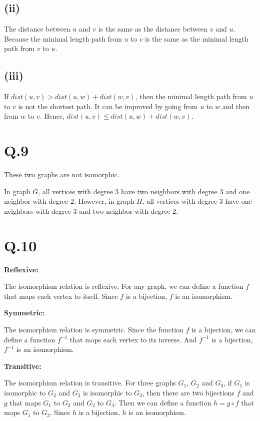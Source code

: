 \documentclass[a4paper,12pt]{article}
\begin{document}
\subsection*{(ii)}

The distance between $u$ and $v$ is the same as the distance between $v$ and $u$.
Because the minimal length path from $u$ to $v$ is the same as the minimal length path from $v$ to $u$.

\subsection*{(iii)}

If $dist(u,v) > dist(u,w) + dist(w,v)$, then the minimal length path from $u$ to $v$ is not the shortest path.
It can be improved by going from $u$ to $w$ and then from $w$ to $v$.
Hence, $dist(u,v) \leq dist(u,w) + dist(w,v)$.

\section*{Q.9}

These two graphs are not isomorphic.

In graph $G$, all vertices with degree 3 have two neighbors with degree 3 and one neighbor with degree 2.
However, in graph $H$, all vertices with degree 3 have one neighbors with degree 3 and two neighbor with degree 2.

\section*{Q.10}

\textbf{Reflexive:}

The isomorphism relation is reflexive.
For any graph, we can define a function $f$ that maps each vertex to itself.
Since $f$ is a bijection, $f$ is an isomorphism.

\textbf{Symmetric:}

The isomorphism relation is symmetric.
Since the function $f$ is a bijection, we can define a function $f^{-1}$ that maps each vertex to its inverse.
And $f^{-1}$ is a bijection, $f^{-1}$ is an isomorphism.

\textbf{Transitive:}

The isomorphism relation is transitive.
For three graphs $G_1$, $G_2$ and $G_3$, if $G_1$ is isomorphic to $G_2$ and $G_2$ is isomorphic to $G_3$, then there are two bijections $f$ and $g$ that maps $G_1$ to $G_2$ and $G_2$ to $G_3$.
Then we can define a function $h = g \circ f$ that maps $G_1$ to $G_3$.
Since $h$ is a bijection, $h$ is an isomorphism.
\end{document}
